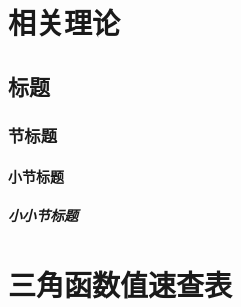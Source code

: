 

\maketitle
\frontmatter

\tableofcontents

\mainmatter

\part{相关理论}\label{part:introduce}

\chapter{标题}
\section{节标题}
\subsection{小节标题}
\subsubsection{小小节标题}

\part{三角函数值速查表}\label{part:trig}
\setcounter{chapter}{0}







% 
